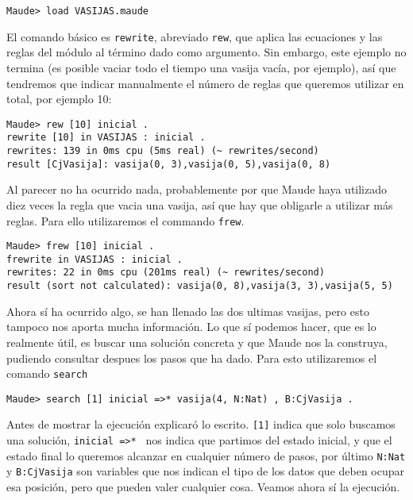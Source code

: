 {\codesize
\begin{verbatim}
Maude> load VASIJAS.maude
\end{verbatim}
}

El comando básico es \texttt{rewrite}, abreviado \texttt{rew}, que aplica las ecuaciones y las reglas del módulo al término dado como argumento. Sin embargo, este ejemplo no termina (es posible vaciar todo el tiempo
una vasija vacía, por ejemplo), así que tendremos que indicar manualmente el número de reglas que queremos utilizar en total, por ejemplo 10:

{\codesize
\begin{verbatim}
Maude> rew [10] inicial .
rewrite [10] in VASIJAS : inicial .
rewrites: 139 in 0ms cpu (5ms real) (~ rewrites/second)
result [CjVasija]: vasija(0, 3),vasija(0, 5),vasija(0, 8)
\end{verbatim}
}

Al parecer no ha ocurrido nada, probablemente por que Maude haya utilizado diez veces la regla que vacia una vasija, así que hay que obligarle a utilizar más reglas. Para ello utilizaremos el commando \texttt{frew}.

{\codesize
\begin{verbatim}
Maude> frew [10] inicial .
frewrite in VASIJAS : inicial .
rewrites: 22 in 0ms cpu (201ms real) (~ rewrites/second)
result (sort not calculated): vasija(0, 8),vasija(3, 3),vasija(5, 5)
\end{verbatim}
}

Ahora sí ha ocurrido algo, se han llenado las dos ultimas vasijas, pero esto tampoco nos aporta mucha información. Lo que sí podemos hacer, que es lo realmente útil, es buscar una solución concreta y que Maude nos la construya, pudiendo consultar despues los pasos que ha dado. Para esto utilizaremos el comando \texttt{search}

{\codesize
\begin{verbatim}
Maude> search [1] inicial =>* vasija(4, N:Nat) , B:CjVasija .
\end{verbatim}
}

Antes de mostrar la ejecución explicaró lo escrito. \verb"[1]" indica que solo buscamos una solución, \verb"inicial =>* " nos indica que partimos del estado inicial, y que el estado final lo queremos alcanzar en cualquier número de pasos, por último \verb"N:Nat" y \verb"B:CjVasija" son variables que nos indican el tipo de los datos que deben ocupar esa posición, pero que pueden valer cualquier cosa. Veamos ahora sí la ejecución.\par

